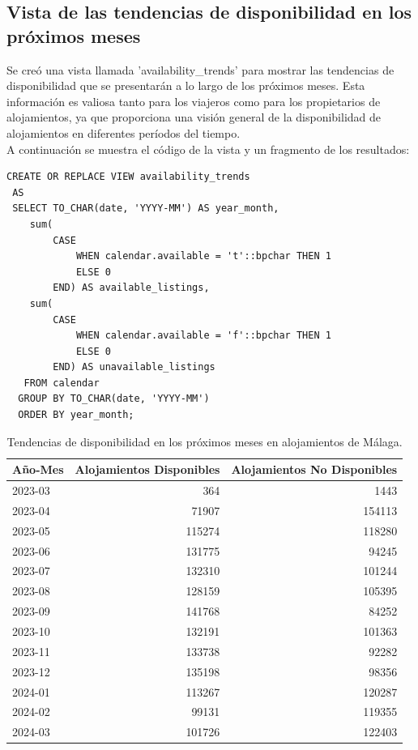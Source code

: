 \subsection{Vista de las tendencias de disponibilidad en los próximos meses}
Se creó una vista llamada 'availability\_trends' para mostrar las tendencias de disponibilidad que se presentarán a lo largo de los próximos meses. Esta información es valiosa tanto para los viajeros como para los propietarios de alojamientos, ya que proporciona una visión general de la disponibilidad de alojamientos en diferentes períodos del tiempo.\\
A continuación se muestra el código de la vista y un fragmento de los resultados:
\begin{verbatim}
CREATE OR REPLACE VIEW availability_trends
 AS
 SELECT TO_CHAR(date, 'YYYY-MM') AS year_month,
    sum(
        CASE
            WHEN calendar.available = 't'::bpchar THEN 1
            ELSE 0
        END) AS available_listings,
    sum(
        CASE
            WHEN calendar.available = 'f'::bpchar THEN 1
            ELSE 0
        END) AS unavailable_listings
   FROM calendar
  GROUP BY TO_CHAR(date, 'YYYY-MM')
  ORDER BY year_month;
\end{verbatim}
\begin{table}[h]
\centering

\begin{tabular}{|l|r|r|}
\hline
\textbf{Año-Mes} & \textbf{Alojamientos Disponibles} & \textbf{Alojamientos No Disponibles} \\ \hline
2023-03 & 364 & 1443 \\ \hline
2023-04 & 71907 & 154113 \\ \hline
2023-05 & 115274 & 118280 \\ \hline
2023-06 & 131775 & 94245 \\ \hline
2023-07 & 132310 & 101244 \\ \hline
2023-08 & 128159 & 105395 \\ \hline
2023-09 & 141768 & 84252 \\ \hline
2023-10 & 132191 & 101363 \\ \hline
2023-11 & 133738 & 92282 \\ \hline
2023-12 & 135198 & 98356 \\ \hline
2024-01 & 113267 & 120287 \\ \hline
2024-02 & 99131 & 119355 \\ \hline
2024-03 & 101726 & 122403 \\ \hline
\end{tabular}
\caption{Tendencias de disponibilidad en los próximos meses en alojamientos de Málaga.}
\end{table}
